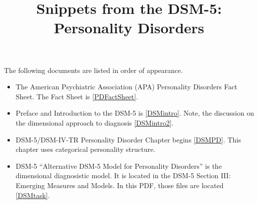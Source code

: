 \documentclass[a4paper,man,natbib,12pt,apacite]{apa6}\usepackage[]{graphicx}\usepackage[]{color}
\begin{document}
\title{Snippets from the DSM-5: Personality Disorders}
\maketitle {}The following documents are listed in order of appearance. \begin{itemize} \item The American Psychiatric Association (APA) Personality Disorders Fact Sheet. The Fact Sheet is \vref{PDFactSheet}.

\item Preface and Introduction to the DSM-5 is \vref{DSMintro}. Note, the discussion on the dimensional approach to diagnosis \vref{DSMintro2}.
\item DSM-5/DSM-IV-TR Personality Disorder Chapter begins \vref{DSMPD}. This chapter uses categorical personality structure.
\item DSM-5 ``Alternative DSM-5 Model for Personality Disorders'' is the dimensional diagnosistic model. It is located in the DSM-5 Section III: Emerging Measures and Models. In this PDF, those files are located \vref{DSMtask}.\end{itemize}






\end{document}

